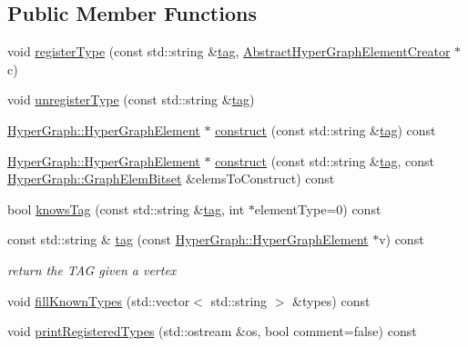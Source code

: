 \subsection*{Public Member Functions}
\begin{DoxyCompactItemize}
\item 
void \mbox{\hyperlink{classg2o_1_1_factory_aba2f2e40635fd1b996981cefdb65c346}{register\+Type}} (const std\+::string \&\mbox{\hyperlink{classg2o_1_1_factory_ae6b0fb89dc45ea1e506401d349c869f0}{tag}}, \mbox{\hyperlink{classg2o_1_1_abstract_hyper_graph_element_creator}{Abstract\+Hyper\+Graph\+Element\+Creator}} $\ast$c)
\item 
void \mbox{\hyperlink{classg2o_1_1_factory_a01b16c7d5a49ddab5ccd5980f76900b7}{unregister\+Type}} (const std\+::string \&\mbox{\hyperlink{classg2o_1_1_factory_ae6b0fb89dc45ea1e506401d349c869f0}{tag}})
\item 
\mbox{\hyperlink{structg2o_1_1_hyper_graph_1_1_hyper_graph_element}{Hyper\+Graph\+::\+Hyper\+Graph\+Element}} $\ast$ \mbox{\hyperlink{classg2o_1_1_factory_aa61fcb8861afb1dd4c4af5d9cc03d3ec}{construct}} (const std\+::string \&\mbox{\hyperlink{classg2o_1_1_factory_ae6b0fb89dc45ea1e506401d349c869f0}{tag}}) const
\item 
\mbox{\hyperlink{structg2o_1_1_hyper_graph_1_1_hyper_graph_element}{Hyper\+Graph\+::\+Hyper\+Graph\+Element}} $\ast$ \mbox{\hyperlink{classg2o_1_1_factory_a8c3800dfa57718d2ceb4f6150611540d}{construct}} (const std\+::string \&\mbox{\hyperlink{classg2o_1_1_factory_ae6b0fb89dc45ea1e506401d349c869f0}{tag}}, const \mbox{\hyperlink{classg2o_1_1_hyper_graph_a7b8fda20e1b03e92aeceeac6e8218b73}{Hyper\+Graph\+::\+Graph\+Elem\+Bitset}} \&elems\+To\+Construct) const
\item 
bool \mbox{\hyperlink{classg2o_1_1_factory_a20292a9c8417303fec92057826ba2430}{knows\+Tag}} (const std\+::string \&\mbox{\hyperlink{classg2o_1_1_factory_ae6b0fb89dc45ea1e506401d349c869f0}{tag}}, int $\ast$element\+Type=0) const
\item 
const std\+::string \& \mbox{\hyperlink{classg2o_1_1_factory_ae6b0fb89dc45ea1e506401d349c869f0}{tag}} (const \mbox{\hyperlink{structg2o_1_1_hyper_graph_1_1_hyper_graph_element}{Hyper\+Graph\+::\+Hyper\+Graph\+Element}} $\ast$v) const
\begin{DoxyCompactList}\small\item\em return the T\+AG given a vertex \end{DoxyCompactList}\item 
void \mbox{\hyperlink{classg2o_1_1_factory_af31924e76d04bcfd77a53cec8f1b778c}{fill\+Known\+Types}} (std\+::vector$<$ std\+::string $>$ \&types) const
\item 
void \mbox{\hyperlink{classg2o_1_1_factory_a564b37b3ccbdd559a386b40ca16d219b}{print\+Registered\+Types}} (std\+::ostream \&os, bool comment=false) const
\end{DoxyCompactItemize}

